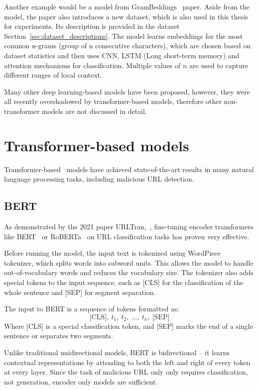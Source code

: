 Another example would be a model from GramBeddings~\cite{GramBeddings} paper. Aside from the model, the paper also introduces a new dataset, which is also used in this thesis for experiments. Its description is provided in the dataset Section~\ref{sec:dataset_descriptions}. The model learns embeddings for the most common n-grams (group of n consecutive characters), which are chosen based on dataset statistics and then uses CNN, LSTM (Long short-term memory) and attention mechanisms for classification. Multiple values of $n$ are used to capture different ranges of local context.

Many other deep learning-based models have been proposed, however, they were all recently overshadowed by transformer-based models, therefore other non-transformer models are not discussed in detail.

\section{Transformer-based models}
Transformer-based~\cite{AttentionIsAllYouNeed} models have achieved state-of-the-art results in many natural language processing tasks, including malicious URL detection.

\subsection{BERT}
As demonstrated by the 2021 paper URLTran,~\cite{URLTran}, fine-tuning encoder transformers like BERT~\cite{BERT} or RoBERTa~\cite{RoBERTa} on URL classification tasks has proven very effective.

Before running the model, the input text is tokenized using WordPiece~\cite{wordpiece} tokenizer, which splits words into subword units. This allows the model to handle out-of-vocabulary words and reduces the vocabulary size. The tokenizer also adds special tokens to the input sequence, such as [CLS] for the classification of the whole sentence and [SEP] for segment separation.

The input to BERT is a sequence of tokens formatted as:
$$
    \text{[CLS]},\ t_1,\ t_2,\ \dots,\ t_n,\ \text{[SEP]}
$$
Where [CLS] is a special classification token, and [SEP] marks the end of a single sentence or separates two segments.

Unlike traditional unidirectional models, BERT is bidirectional -- it learns contextual representations by attending to both the left and right of every token at every layer. Since the task of malicious URL only only requires classification, not generation, encoder only models are sufficient.

